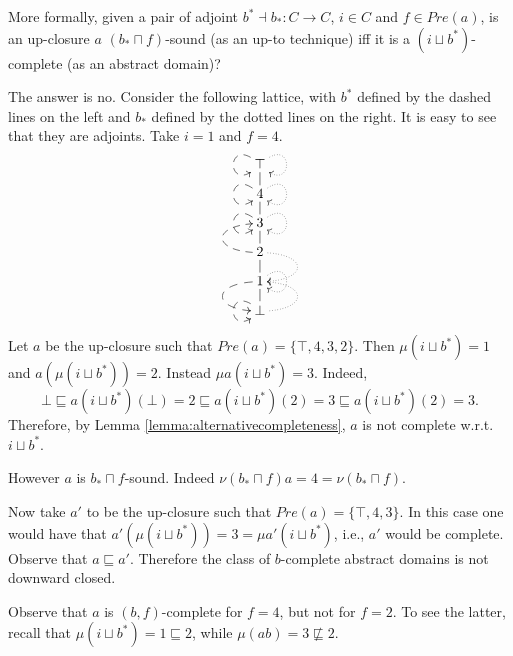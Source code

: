 \documentclass{llncs}
\begin{document}
More formally, given a pair of adjoint $b^*\dashv b_* \colon C\to C$, $i\in C$ and $f\in Pre(a)$, is an up-closure $a$ $(b_*\sqcap f)$-sound (as an up-to technique) iff it is a $(i \sqcup b^*)$-complete (as an abstract domain)?

The answer is no.  Consider the following lattice, with $b^*$ defined by the dashed lines on the left and $b_*$ defined by the dotted lines on the right. It is easy to see that they are adjoints. Take $i=1$ and $f=4$. 
$$
\begin{array}{c}
{\lower-1.2cm\hbox{\xymatrix@R=0.3cm@C=0.3cm{  
\top \ar@{-->}@(ul,dl) \ar@{.>}@(ur,dr)  \\
4 \ar@{-->}@(ul,dl) \ar@{-}[u] \ar@{.>}@(ur,dr)   \\
3 \ar@{-->}@(ul,dl) \ar@{-}[u]  \ar@{.>}@(ur,dr)  \\
2\ar@{-}[u] \ar@{-->}@(l,l)[u] \ar@{.>}@(r,r)[d] \\
1\ar@{-}[u] \ar@{-->}@(l,l)[d] \ar@{.>}@(ur,dr)  \\
\bot \ar@{-->}@(ul,dl) \ar@{-}[u] \ar@{.>}@(r,r)[u]
}}}\end{array}
$$

Let $a$ be the up-closure  such that $Pre(a)= \{\top, 4,3,2\}$.
Then $\mu (i \sqcup b^*) = 1$ and $a(\mu (i \sqcup b^*) ) =2$.
Instead $\mu a (i \sqcup b^*)= 3$. Indeed,
$$\bot \sqsubseteq a (i \sqcup b^*)(\bot)= 2 \sqsubseteq a (i \sqcup b^*)(2)=3 \sqsubseteq a (i \sqcup b^*)(2)=3\text{.}$$
Therefore, by Lemma \ref{lemma:alternativecompleteness}, $a$ is not complete w.r.t. $i \sqcup b^*$.

However $a$ is $b_*\sqcap f$-sound. Indeed $\nu (b_*\sqcap f)a = 4 =  \nu (b_*\sqcap f)$.

\medskip

Now take $a'$ to be the up-closure  such that $Pre(a)= \{\top, 4,3\}$. In this case one would have that $a'(\mu (i \sqcup b^*) ) = 3 = \mu a' (i \sqcup b^*)$, i.e., $a'$ would be complete.
Observe that $a\sqsubseteq a'$. Therefore the class of $b$-complete abstract domains is not downward closed.

Observe that $a$ is $(b,f)$-complete for $f=4$, but not for $f=2$. To see the latter, recall that  $\mu (i \sqcup b^*) = 1\sqsubseteq 2$, while $\mu (ab)=3 \not \sqsubseteq 2$.




\end{document}
